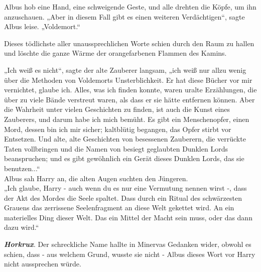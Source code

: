 {Albus hob eine Hand, eine schweigende Geste, und alle drehten die Köpfe, um ihn anzuschauen. „Aber in diesem Fall gibt es einen weiteren Verdächtigen“, sagte Albus leise. „Voldemort.“

Dieses tödlichste aller unaussprechlichen Worte schien durch den Raum zu hallen und löschte die ganze Wärme der orangefarbenen Flammen des Kamins.

„Ich weiß es nicht“, sagte der alte Zauberer langsam, „ich weiß nur allzu wenig über die Methoden von Voldemorts Unsterblichkeit. Er hat diese Bücher vor mir vernichtet, glaube ich. Alles, was ich finden konnte, waren uralte Erzählungen, die über zu viele Bände verstreut waren, als dass er sie hätte entfernen können. Aber die Wahrheit unter vielen Geschichten zu finden, ist auch die Kunst eines Zauberers, und darum habe ich mich bemüht. Es gibt ein Menschenopfer, einen Mord, dessen bin ich mir sicher; kaltblütig begangen, das Opfer stirbt vor Entsetzen. Und alte, alte Geschichten von besessenen Zauberern, die verrückte Taten vollbringen und die Namen von besiegt geglaubten Dunklen Lords beanspruchen; und es gibt gewöhnlich ein Gerät dieses Dunklen Lords, das sie benutzen...“\\ Albus sah Harry an, die alten Augen suchten den Jüngeren.\\ „Ich glaube, Harry - auch wenn du es nur eine Vermutung nennen wirst -, dass der Akt des Mordes die Seele spaltet. Dass durch ein Ritual des schwärzesten Grauens das zerrissene Seelenfragment an diese Welt gekettet wird. An ein materielles Ding dieser Welt. Das ein Mittel der Macht sein muss, oder das dann dazu wird.“

\textbf{\emph{Horkrux}}. Der schreckliche Name hallte in Minervas Gedanken wider, obwohl es schien, dass - aus welchem Grund, wusste sie nicht - Albus dieses Wort vor Harry nicht aussprechen würde.

}
